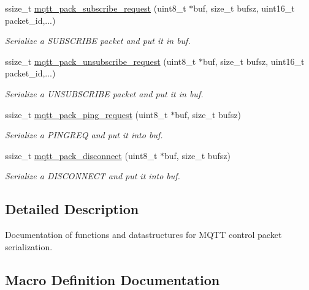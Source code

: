 \begin{DoxyCompactItemize}
ssize\+\_\+t \hyperlink{group__packers_ga65a198063d780e654af0336e5088f609}{mqtt\+\_\+pack\+\_\+subscribe\+\_\+request} (uint8\+\_\+t $\ast$buf, size\+\_\+t bufsz, uint16\+\_\+t packet\+\_\+id,...)
\begin{DoxyCompactList}\small\item\em Serialize a S\+U\+B\+S\+C\+R\+I\+BE packet and put it in {\ttfamily buf}. \end{DoxyCompactList}\item 
ssize\+\_\+t \hyperlink{group__packers_ga3a0e5c05084d708f16cb1a244cbcaad5}{mqtt\+\_\+pack\+\_\+unsubscribe\+\_\+request} (uint8\+\_\+t $\ast$buf, size\+\_\+t bufsz, uint16\+\_\+t packet\+\_\+id,...)
\begin{DoxyCompactList}\small\item\em Serialize a U\+N\+S\+U\+B\+S\+C\+R\+I\+BE packet and put it in {\ttfamily buf}. \end{DoxyCompactList}\item 
ssize\+\_\+t \hyperlink{group__packers_gac11b5cc5c6bbbf386c2515c823965a82}{mqtt\+\_\+pack\+\_\+ping\+\_\+request} (uint8\+\_\+t $\ast$buf, size\+\_\+t bufsz)
\begin{DoxyCompactList}\small\item\em Serialize a P\+I\+N\+G\+R\+EQ and put it into {\ttfamily buf}. \end{DoxyCompactList}\item 
ssize\+\_\+t \hyperlink{group__packers_ga7842c85a0711df31f2e9ce31a9253999}{mqtt\+\_\+pack\+\_\+disconnect} (uint8\+\_\+t $\ast$buf, size\+\_\+t bufsz)
\begin{DoxyCompactList}\small\item\em Serialize a D\+I\+S\+C\+O\+N\+N\+E\+CT and put it into {\ttfamily buf}. \end{DoxyCompactList}\end{DoxyCompactItemize}


\subsection{Detailed Description}
Documentation of functions and datastructures for M\+Q\+TT control packet serialization. 



\subsection{Macro Definition Documentation}
